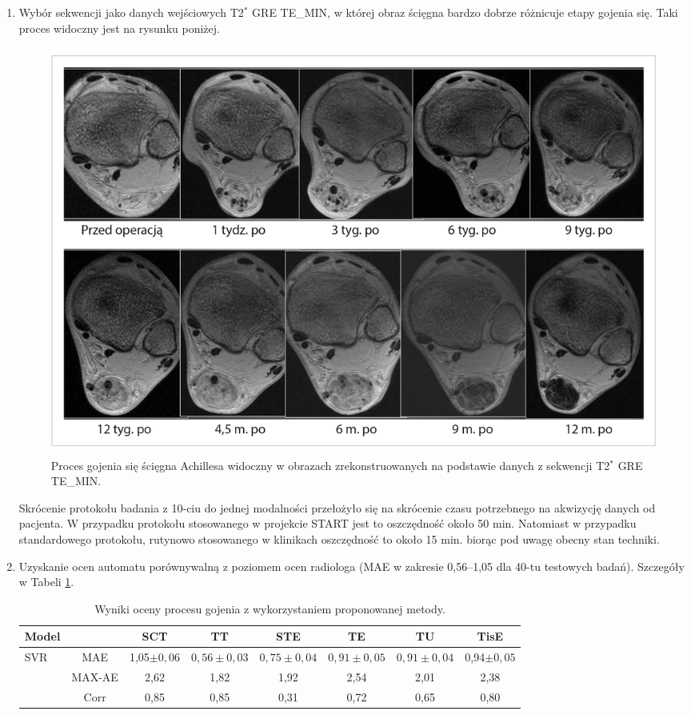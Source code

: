 \begin{enumerate}
	\item Wybór sekwencji jako danych wejściowych T2$^\ast$ GRE TE\_MIN, w której obraz ścięgna bardzo dobrze różnicuje etapy gojenia się. Taki proces widoczny jest na rysunku poniżej.
	\begin{figure}[h!]
		\centering
		\includegraphics[width=1\textwidth]{figures/T2gremin.jpg}
		\caption{Proces gojenia się ścięgna Achillesa widoczny w obrazach zrekonstruowanych na podstawie danych z sekwencji T2$^\ast$ GRE TE\_MIN.}\label{fig:T2comp}
	\end{figure}
	Skrócenie protokołu badania z 10-ciu do jednej modalności przełożyło się na skrócenie czasu potrzebnego na akwizycję danych od pacjenta. W przypadku protokołu stosowanego w projekcie START jest to oszczędność około 50 min. Natomiast w przypadku standardowego protokołu, rutynowo stosowanego w klinikach oszczędność to około 15 min. biorąc pod uwagę obecny stan techniki. 
	\item Uzyskanie ocen automatu porównywalną z poziomem ocen radiologa (MAE w zakresie 0,56--1,05 dla 40-tu testowych badań). Szczegóły w Tabeli \ref{tab:trainset}. 
	\vspace{0.5 cm}
	\begin{table}[h!]
		\scriptsize
		\caption{Wyniki oceny procesu gojenia z wykorzystaniem proponowanej metody.}
		\vspace{-0.5 cm}
		\begin{center}
			\begin{tabular}{lc||c|c|c|c|c|c}
				\textbf{Model} & & \textbf{SCT} & \textbf{TT} & \textbf{STE} & \textbf{TE} & \textbf{TU} & \textbf{TisE}\\ 				
				\hline \hline
				\multirow{3}{*}{SVR}
				& MAE & 1,05$\pm0,06$ & $0,56\pm0,03$ & $0,75\pm0,04$ & $0,91\pm0,05$ & $0,91\pm0,04$ & 0,94$\pm0,05$\\
				& MAX-AE & 2,62 & 1,82 & 1,92 & 2,54 & 2,01 & 2,38 \\
				& Corr   & 0,85 & 0,85 & 0,31 & 0,72 & 0,65 & 0,80 \\
				\hline
			\end{tabular}
		\end{center}
		\label{tab:trainset}
	\end{table}	
	

\end{enumerate}
